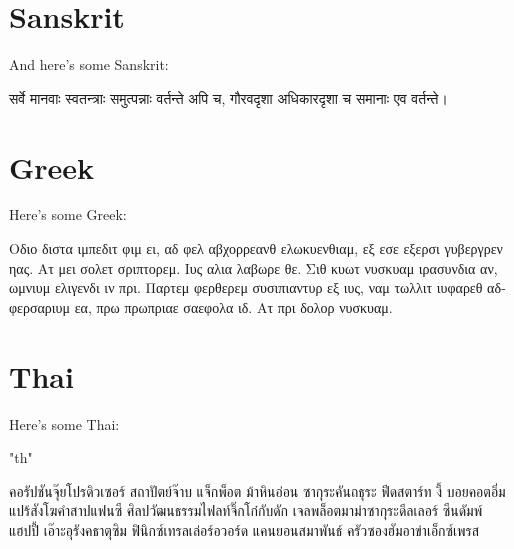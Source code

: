 \documentclass{report}
\begin{document}
\section{Sanskrit}
And here's some Sanskrit:

\begin{sanskrit}
सर्वे मानवाः स्वतन्त्राः समुत्पन्नाः वर्तन्ते अपि च, गौरवदृशा अधिकारदृशा च समानाः एव वर्तन्ते।
\end{sanskrit}




\section{Greek}
Here's some Greek:

\begin{greek}
Οδιο διστα ιμπεδιτ φιμ ει, αδ φελ αβχορρεανθ ελωκυενθιαμ, εξ εσε εξερσι γυβεργρεν ηας. Ατ μει σολετ σριπτορεμ. Ιυς αλια λαβωρε θε. Σιθ κυωτ νυσκυαμ ιρασυνδια αν, ωμνιυμ ελιγενδι ιν πρι. Παρτεμ φερθερεμ συσιπιαντυρ εξ ιυς, ναμ τωλλιτ ιυφαρεθ αδφερσαριυμ εα, πρω πρωπριαε σαεφολα ιδ. Ατ πρι δολορ νυσκυαμ.
\end{greek}



\section{Thai}
Here's some Thai:

\begin{thai}
\XeTeXlinebreaklocale "th"
\raggedright
คอรัปชันจุ๊ยโปรดิวเซอร์ สถาปัตย์จ๊าบ แจ็กพ็อต ม้าหินอ่อน ซากุระคันถธุระ ฟีดสตาร์ท งี้ บอยคอตอิ่มแปร้สังโฆคำสาปแฟนซี ศิลปวัฒนธรรมไฟลท์จิ๊กโก๋กับดัก เจลพล็อตมาม่าซากุระดีลเลอร์ ซีนดัมพ์ แฮปปี้ เอ๊าะอุรังคธาตุซิม ฟินิกซ์เทรลเล่อร์อวอร์ด แคนยอนสมาพันธ์ ครัวซองฮัมอาข่าเอ็กซ์เพรส 
\end{thai}
\end{document}
